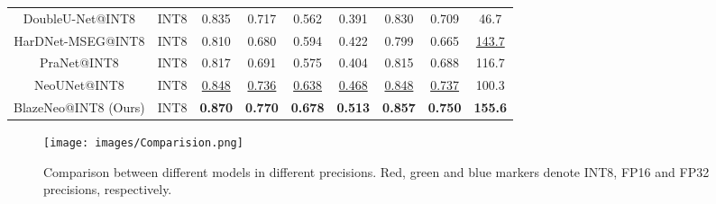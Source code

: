 \documentclass{ieeeaccess}
\newcommand{\ModelName}{BlazeNeo\xspace}
\begin{document}
\begin{table*}[ht!]
\begin{tabular}{@{} c | c | c c c c c c | c @{}}
        DoubleU-Net@INT8            & INT8                             & 0.835                                   & 0.717                                  & 0.562                                   & 0.391                                  & 0.830                                   & 0.709                                   & 46.7                    \\
        HarDNet-MSEG@INT8           & INT8                             & 0.810                                   & 0.680                                  & 0.594                                   & 0.422                                  & 0.799                                   & 0.665                                   & \underline{143.7}       \\
        PraNet@INT8                 & INT8                             & 0.817                                   & 0.691                                  & 0.575                                   & 0.404                                  & 0.815                                   & 0.688                                   & 116.7                   \\
        NeoUNet@INT8                & INT8                             & \underline{0.848}                       & \underline{0.736}                      & \underline{0.638}                       & \underline{0.468}                      & \underline{0.848}                       & \underline{0.737}                       & 100.3                   \\
        \ModelName{}@INT8 (Ours)    & INT8                             & \textbf{0.870}                          & \textbf{0.770}                         & \textbf{0.678}                          & \textbf{0.513}                         & \textbf{0.857}                          & \textbf{0.750}                          & \textbf{155.6}          \\
        \bottomrule
    \end{tabular}
\end{table*}

\begin{figure*}[ht!]
    \begin{center}
        \texttt{[image: images/Comparision.png]}
    \end{center}
    \caption{Comparison between different models in different precisions. Red, green and blue markers denote INT8, FP16 and FP32 precisions, respectively.}
    \label{fig:perf_comparision}
\end{figure*}
\end{document}
